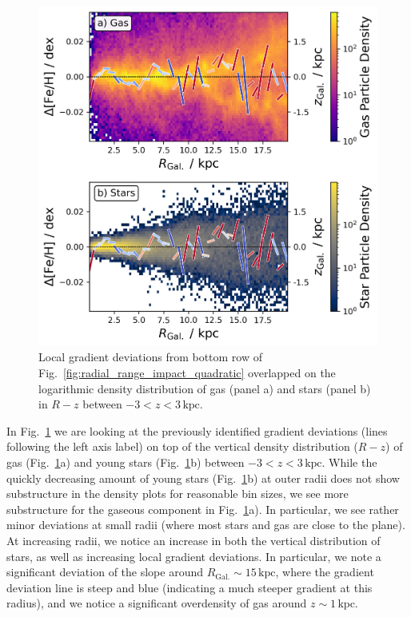 \documentclass[fleqn,usenatbib]{mnras}
\begin{document}
\begin{figure}
    \centering
    \includegraphics[width=\columnwidth]{figures/overlap_local_variation_gas.png}
    \caption{Local gradient deviations from bottom row of Fig.~\ref{fig:radial_range_impact_quadratic} overlapped on the logarithmic density distribution of gas (panel a) and stars (panel b) in $R-z$ between $-3 < z < 3\,\mathrm{kpc}$.}
    \label{fig:overlap_local_variation_gas}
\end{figure}

In Fig.~\ref{fig:overlap_local_variation_gas} we are looking at the previously identified gradient deviations (lines following the left axis label) on top of the vertical density distribution ($R-z$) of gas (Fig.~\ref{fig:overlap_local_variation_gas}a) and young stars (Fig.~\ref{fig:overlap_local_variation_gas}b) between $-3 < z < 3\,\mathrm{kpc}$. While the quickly decreasing amount of young stars (Fig.~\ref{fig:overlap_local_variation_gas}b) at outer radii does not show substructure in the density plots for reasonable bin sizes, we see more substructure for the gaseous component in Fig.~\ref{fig:overlap_local_variation_gas}a). In particular, we see rather minor deviations at small radii (where most stars and gas are close to the plane). At increasing radii, we notice an increase in both the vertical distribution of stars, as well as increasing local gradient deviations. In particular, we note a significant deviation of the slope around $R_\mathrm{Gal.} \sim 15\,\mathrm{kpc}$, where the gradient deviation line is steep and blue (indicating a much steeper gradient at this radius), and we notice a significant overdensity of gas around $z \sim 1\,\mathrm{kpc}$.
\end{document}
